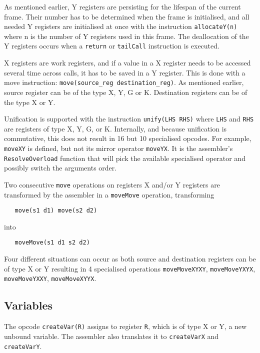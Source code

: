 \documentclass[a4paper]{memoir}
\begin{document}
As mentioned earlier, Y registers are persisting for the lifespan of the current frame. Their number has to be determined when the frame is initialised, and all needed Y registers are initialised at once with the instruction \lstinline!allocateY(n)! where n is the number of Y registers used in this frame.
The deallocation of the Y registers occurs when a \lstinline!return! or
\lstinline!tailCall! instruction is executed.

X registers are work registers, and if a value in a X register needs to be accessed several time across calls, it has to be saved in a Y register. This is done with a move instruction: \lstinline!move(source_reg destination_reg)!.
As mentioned earlier, source
register can be of the type X, Y, G or K. Destination registers can be of the
type X or Y.

Unification is supported with the instruction \lstinline!unify(LHS RHS)! where
\lstinline!LHS! and \lstinline!RHS! are registers of type X, Y, G, or K.
Internally, and because unification is commutative, this does not result in 16 but 10 specialised opcodes. For example,
\lstinline!moveXY! is defined, but not its mirror operator \lstinline!moveYX!.
It is the assembler's \lstinline!ResolveOverload! function that will pick the
available specialised operator and possibly switch the arguments order.

Two consecutive \lstinline!move! operations on registers X and/or Y registers are transformed by the assembler in
a \lstinline!moveMove! operation, transforming 
\begin{lstlisting}
   move(s1 d1) move(s2 d2)
\end{lstlisting}
 into
 \begin{lstlisting}
   moveMove(s1 d1 s2 d2)
 \end{lstlisting}

Four different situations can occur as both
source and destination registers can be of type X or Y resulting in 4
specialised operations \lstinline!moveMoveXYXY!, \lstinline!moveMoveYXYX!, \lstinline!moveMoveYXXY!,
\lstinline!moveMoveXYYX!.


\subsection{Variables}\label{sec:opcode:variables}
The opcode \lstinline!createVar(R)! assigns to register \lstinline!R!, which is
of type X or Y, a new unbound variable. The assembler also translates it to
\lstinline!createVarX! and \lstinline!createVarY!.
\end{document}
